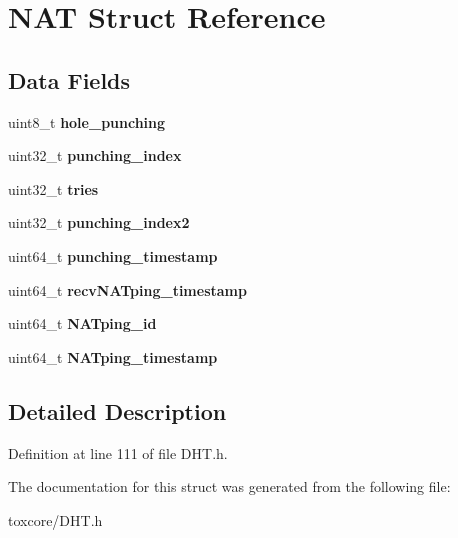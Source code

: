 \hypertarget{struct_n_a_t}{\section{N\+A\+T Struct Reference}
\label{struct_n_a_t}
}
\subsection*{Data Fields}
\begin{DoxyCompactItemize}
\item 
\hypertarget{struct_n_a_t_a40495f11f0e91fcea43d57248e202ea3}{uint8\+\_\+t {\bfseries hole\+\_\+punching}}\label{struct_n_a_t_a40495f11f0e91fcea43d57248e202ea3}

\item 
\hypertarget{struct_n_a_t_aeb4b0f7724adb0857b15e0f34e95ecca}{uint32\+\_\+t {\bfseries punching\+\_\+index}}\label{struct_n_a_t_aeb4b0f7724adb0857b15e0f34e95ecca}

\item 
\hypertarget{struct_n_a_t_a852b5b4a6ac0e351887ab6dde3e3fcc5}{uint32\+\_\+t {\bfseries tries}}\label{struct_n_a_t_a852b5b4a6ac0e351887ab6dde3e3fcc5}

\item 
\hypertarget{struct_n_a_t_a1d36817a78a0e261e7ca0982e17aa4ee}{uint32\+\_\+t {\bfseries punching\+\_\+index2}}\label{struct_n_a_t_a1d36817a78a0e261e7ca0982e17aa4ee}

\item 
\hypertarget{struct_n_a_t_ab8cadc230283568e7aeb303691d8e374}{uint64\+\_\+t {\bfseries punching\+\_\+timestamp}}\label{struct_n_a_t_ab8cadc230283568e7aeb303691d8e374}

\item 
\hypertarget{struct_n_a_t_a237df5177fc9db865722933b5b6468ea}{uint64\+\_\+t {\bfseries recv\+N\+A\+Tping\+\_\+timestamp}}\label{struct_n_a_t_a237df5177fc9db865722933b5b6468ea}

\item 
\hypertarget{struct_n_a_t_addd9408d04ff8e05c569651b299f1b1b}{uint64\+\_\+t {\bfseries N\+A\+Tping\+\_\+id}}\label{struct_n_a_t_addd9408d04ff8e05c569651b299f1b1b}

\item 
\hypertarget{struct_n_a_t_a20937663f98914b69bb73f938deed531}{uint64\+\_\+t {\bfseries N\+A\+Tping\+\_\+timestamp}}\label{struct_n_a_t_a20937663f98914b69bb73f938deed531}

\end{DoxyCompactItemize}


\subsection{Detailed Description}


Definition at line 111 of file D\+H\+T.\+h.



The documentation for this struct was generated from the following file\+:\begin{DoxyCompactItemize}
\item 
toxcore/D\+H\+T.\+h\end{DoxyCompactItemize}

